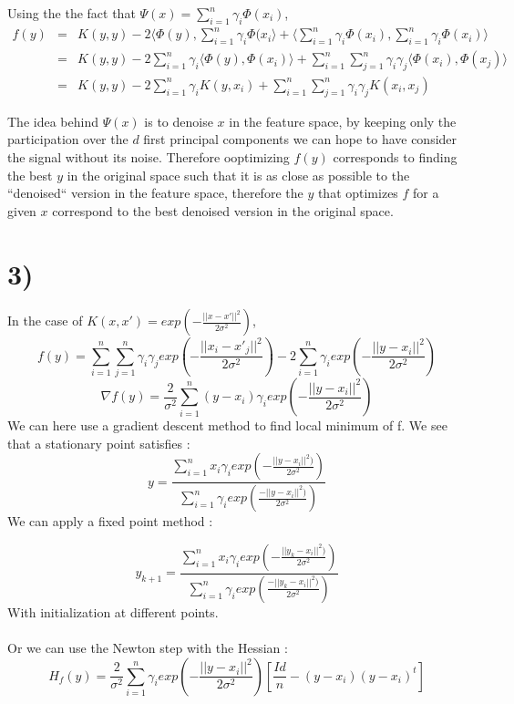 Using the the fact that $\Psi(x) = \sum_{i=1}^n \gamma_i \Phi(x_i)$,
\begin{eqnarray*}
	f(y) &=& K(y,y) - 2\langle \Phi(y), \sum_{i=1}^n \gamma_i \Phi(x_i \rangle + \langle \sum_{i=1}^n \gamma_i \Phi(x_i), \sum_{i=1}^n \gamma_i \Phi(x_i) \rangle \\
	&=& K(y,y) - 2\sum_{i=1}^n \gamma_i \langle \Phi(y), \Phi(x_i) \rangle + \sum_{i=1}^n \sum_{j=1}^n \gamma_i\gamma_j\langle  \Phi(x_i),  \Phi(x_j) \rangle \\
	&=& K(y,y) - 2\sum_{i=1}^n \gamma_i K(y,x_i) + \sum_{i=1}^n \sum_{j=1}^n \gamma_i\gamma_j K(x_i,x_j)
\end{eqnarray*}

The idea behind $\Psi(x)$ is to denoise $x$ in the feature space, by keeping only the participation over the $d$ first principal components we can hope to have consider the signal without its noise. Therefore ooptimizing $f(y)$ corresponds to finding the best $y$ in the original space such that it is as close as possible to the ``denoised`` version in the feature space, therefore the $y$ that optimizes $f$ for a given $x$ correspond to the best denoised version in the original space.

\section*{3)}
In the case of $K(x,x')=exp(-\frac{||x-x'||^{2}}{2\sigma^{2}})$,
$$f(y)=\sum_{i=1}^{n}\sum_{j=1}^{n}\gamma_{i}\gamma_{j}exp(-\frac{||x_{i}-x'_{j}||^{2}}{2\sigma^{2}})-2\sum_{i=1}^{n}\gamma_{i}exp(-\frac{||y-x_{i}||^{2}}{2\sigma^{2}})$$
$$\nabla f(y)=\frac{2}{\sigma^{2}}\sum_{i=1}^{n}(y-x_{i})\gamma_{i}exp(-\frac{||y-x_{i}||^{2}}{2\sigma^{2}})$$
We can here use a gradient descent method to find local minimum of f. We see that a stationary point satisfies : 
$$y=\frac{\sum_{i=1}^{n}x_{i}\gamma_{i}exp(-\frac{||y-x_{i}||^{2})}{2\sigma^{2}})}{\sum_{i=1}^{n}\gamma_{i}exp(\frac{-||y-x_{i}||^{2})}{2\sigma^{2}})}$$
We can apply a fixed point method :

$$y_{k+1}=\frac{\sum_{i=1}^{n}x_{i}\gamma_{i}exp(-\frac{||y_{k}-x_{i}||^{2})}{2\sigma^{2}})}{\sum_{i=1}^{n}\gamma_{i}exp(\frac{-||y_{k}-x_{i}||^{2})}{2\sigma^{2}})}$$
With initialization at different points.~\\
~\\
Or we can use the Newton step with the Hessian :
$$H_{f}(y)=\frac{2}{\sigma^{2}} \sum_{i=1}^{n}\gamma_{i}exp(-\frac{||y-x_{i}||^{2}}{2\sigma^{2}})[\frac{Id}{n}-(y-x_{i})(y-x_{i})^{t} ]$$

